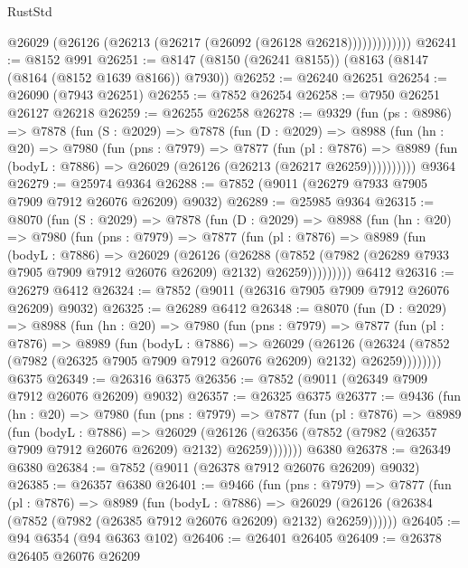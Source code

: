 \begin{lexlean}{RustStd}
\begin{coremodule}
                  @26029 (@26126 (@26213 (@26217 (@26092 (@26128 @26218)))))))))))))
@26241 := @8152 @991
@26251 := @8147 (@8150 (@26241 @8155)) (@8163 (@8147 (@8164 (@8152 @1639 @8166)) @7930))
@26252 := @26240 @26251
@26254 := @26090 (@7943 @26251)
@26255 := @7852 @26254
@26258 := @7950 @26251 @26127 @26218
@26259 := @26255 @26258
@26278 := @9329
    (fun (ps : @8986) =>
    @7878
      (fun (S : @2029) =>
      @7878
        (fun (D : @2029) =>
        @8988
          (fun (hn : @20) =>
          @7980
            (fun (pns : @7979) =>
            @7877
              (fun (pl : @7876) =>
              @8989 (fun (bodyL : @7886) => @26029 (@26126 (@26213 (@26217 @26259))))))))))
    @9364
@26279 := @25974 @9364
@26288 := @7852 (@9011 (@26279 @7933 @7905 @7909 @7912 @26076 @26209) @9032)
@26289 := @25985 @9364
@26315 := @8070
    (fun (S : @2029) =>
    @7878
      (fun (D : @2029) =>
      @8988
        (fun (hn : @20) =>
        @7980
          (fun (pns : @7979) =>
          @7877
            (fun (pl : @7876) =>
            @8989
              (fun (bodyL : @7886) =>
              @26029
                (@26126
                  (@26288
                    (@7852
                      (@7982 (@26289 @7933 @7905 @7909 @7912 @26076 @26209) @2132)
                      @26259)))))))))
    @6412
@26316 := @26279 @6412
@26324 := @7852 (@9011 (@26316 @7905 @7909 @7912 @26076 @26209) @9032)
@26325 := @26289 @6412
@26348 := @8070
    (fun (D : @2029) =>
    @8988
      (fun (hn : @20) =>
      @7980
        (fun (pns : @7979) =>
        @7877
          (fun (pl : @7876) =>
          @8989
            (fun (bodyL : @7886) =>
            @26029
              (@26126
                (@26324 (@7852 (@7982 (@26325 @7905 @7909 @7912 @26076 @26209) @2132) @26259))))))))
    @6375
@26349 := @26316 @6375
@26356 := @7852 (@9011 (@26349 @7909 @7912 @26076 @26209) @9032)
@26357 := @26325 @6375
@26377 := @9436
    (fun (hn : @20) =>
    @7980
      (fun (pns : @7979) =>
      @7877
        (fun (pl : @7876) =>
        @8989
          (fun (bodyL : @7886) =>
          @26029
            (@26126 (@26356 (@7852 (@7982 (@26357 @7909 @7912 @26076 @26209) @2132) @26259)))))))
    @6380
@26378 := @26349 @6380
@26384 := @7852 (@9011 (@26378 @7912 @26076 @26209) @9032)
@26385 := @26357 @6380
@26401 := @9466
    (fun (pns : @7979) =>
    @7877
      (fun (pl : @7876) =>
      @8989
        (fun (bodyL : @7886) =>
        @26029 (@26126 (@26384 (@7852 (@7982 (@26385 @7912 @26076 @26209) @2132) @26259))))))
@26405 := @94 @6354 (@94 @6363 @102)
@26406 := @26401 @26405
@26409 := @26378 @26405 @26076 @26209

\end{coremodule}
\end{lexlean}
